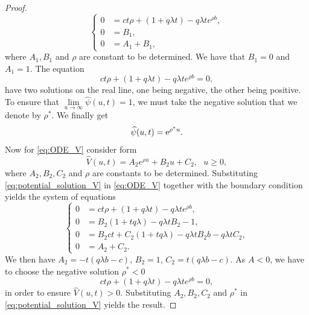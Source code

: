 \begin{proof}
\begin{equation*}
\begin{cases}
0&=ct\rho + \left(1+q\lambda t\right)-q\lambda te^{\rho b}, \\
0&=B_1, \\
0&= A_1+B_1,
\end{cases}
\end{equation*}
where $A_1, B_1$ and $\rho$ are constant to be determined. We have that $B_1 = 0$ and $A_1= 1$. 
The equation
\begin{equation*}
ct\rho + \left(1+q\lambda t\right)-q\lambda te^{\rho b} = 0,
\end{equation*}
have two solutions on the real line, one being negative, the other being positive. To ensure that $\underset{u\rightarrow \infty}{\lim}\widehat{\psi}(u,t) = 1$, we must take the negative solution that we denote by $\rho^\ast$. We finally get
\[
\widehat{\psi}(u,t) = \mathrm{e}^{\rho^{\ast} u}.
\]
Now for \eqref{eq:ODE_V} consider form
\begin{equation}\label{eq:potential_solution_V}
\widehat{V}(u,t) = A_2e^{\rho u }+B_2u + C_2,\text{ }u \ge 0, 
\end{equation}
where $A_2, B_2,C_2$ and $\rho$ are constants to be determined. Substituting \eqref{eq:potential_solution_V} in \eqref{eq:ODE_V} together with the boundary condition yields the system of equations 
\begin{equation*}
\begin{cases}
0&=ct\rho + \left(1+q\lambda t\right)-q\lambda te^{\rho b}, \\
0&= B_2\left(1+tq\lambda\right)-q\lambda tB_2 - 1,\\
0&=B_2ct+C_2(1+tq\lambda) - q\lambda t B_2b-q\lambda tC_2, \\
0&=A_2+C_2.
\end{cases}
\end{equation*}
We then have $A_2 = -t(q\lambda b - c)$, $B_2 = 1$, $C_2 = t(q\lambda b - c)$. As $A<0$, we have to choose the negative solution $\rho^\ast<0$ 
\begin{equation*}
ct\rho + \left(1+q\lambda t\right)-q\lambda te^{\rho b} = 0,
\end{equation*}
in order to ensure $\widehat{V}(u,t)>0$. Substituting $A_2,B_2,C_2$ and $\rho^{\ast}$ in \eqref{eq:potential_solution_V} yields the result.
\end{proof}

